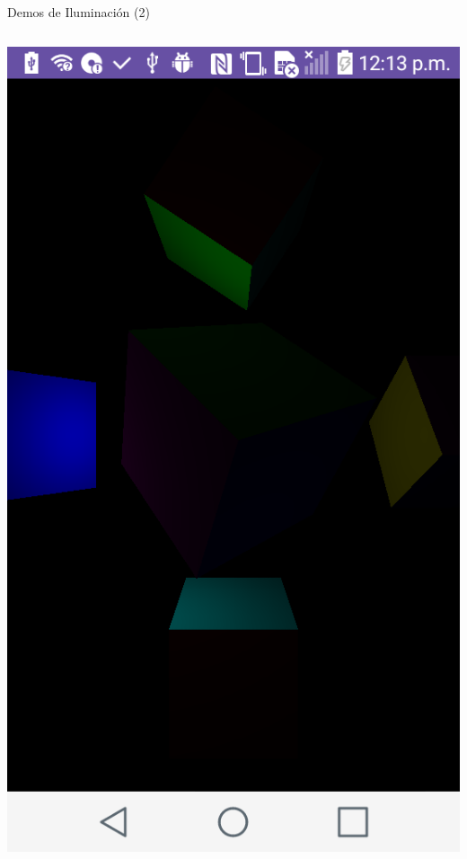 \documentclass[aspectratio=169,compress]{beamer}
\begin{document}
\begin{frame}{Demos de Iluminación (2)}
\begin{columns}
\begin{column}{0.3\textwidth}
\begin{center}
\includegraphics[width=1.0\linewidth]{PantallazosDemoTaller/Demo12.png}
\end{center}
\end{column}
\end{columns}
\end{frame}
\end{document}
